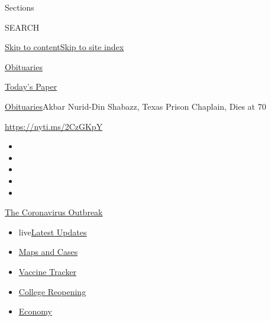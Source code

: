 Sections

SEARCH

\protect\hyperlink{site-content}{Skip to
content}\protect\hyperlink{site-index}{Skip to site index}

\href{https://www.nytimes.com/section/obituaries}{Obituaries}

\href{https://myaccount.nytimes.com/auth/login?response_type=cookie\&client_id=vi}{}

\href{https://www.nytimes.com/section/todayspaper}{Today's Paper}

\href{/section/obituaries}{Obituaries}\textbar{}Akbar Nurid-Din Shabazz,
Texas Prison Chaplain, Dies at 70

\url{https://nyti.ms/2CzGKpY}

\begin{itemize}
\item
\item
\item
\item
\item
\end{itemize}

\href{https://www.nytimes.com/news-event/coronavirus?action=click\&pgtype=Article\&state=default\&region=TOP_BANNER\&context=storylines_menu}{The
Coronavirus Outbreak}

\begin{itemize}
\tightlist
\item
  live\href{https://www.nytimes.com/2020/08/03/world/coronavirus-covid-19.html?action=click\&pgtype=Article\&state=default\&region=TOP_BANNER\&context=storylines_menu}{Latest
  Updates}
\item
  \href{https://www.nytimes.com/interactive/2020/us/coronavirus-us-cases.html?action=click\&pgtype=Article\&state=default\&region=TOP_BANNER\&context=storylines_menu}{Maps
  and Cases}
\item
  \href{https://www.nytimes.com/interactive/2020/science/coronavirus-vaccine-tracker.html?action=click\&pgtype=Article\&state=default\&region=TOP_BANNER\&context=storylines_menu}{Vaccine
  Tracker}
\item
  \href{https://www.nytimes.com/2020/08/02/us/covid-college-reopening.html?action=click\&pgtype=Article\&state=default\&region=TOP_BANNER\&context=storylines_menu}{College
  Reopening}
\item
  \href{https://www.nytimes.com/live/2020/08/03/business/stock-market-today-coronavirus?action=click\&pgtype=Article\&state=default\&region=TOP_BANNER\&context=storylines_menu}{Economy}
\end{itemize}

